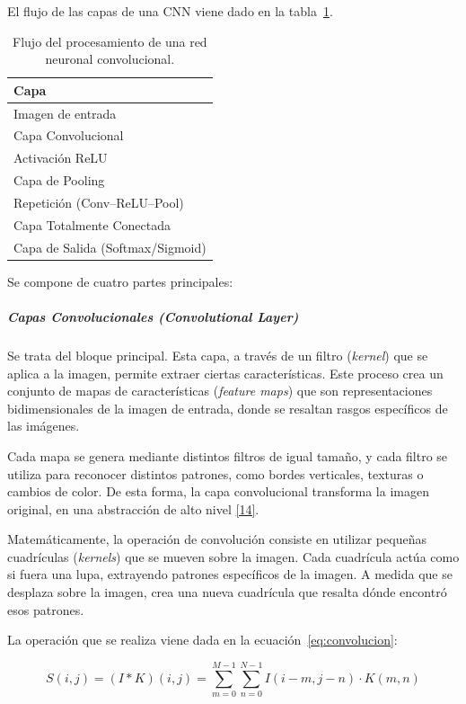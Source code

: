\documentclass[11pt, a4paper]{article}
\numberwithin{equation}{section}
\begin{document}
El flujo de las capas de una CNN viene dado en la tabla~\ref{tab:flujo_cnn}.

\begin{table}[H]
\centering
\caption{Flujo del procesamiento de una red neuronal convolucional.}
\label{tab:flujo_cnn}
\begin{tabular}{l}
\toprule
\textbf{Capa} \\
\midrule
Imagen de entrada \\
Capa Convolucional \\
Activación ReLU \\
Capa de Pooling \\
Repetición (Conv--ReLU--Pool) \\
Capa Totalmente Conectada \\
Capa de Salida (Softmax/Sigmoid) \\
\bottomrule
\end{tabular}
\end{table}

Se compone de cuatro partes principales:

\subparagraph{Capas Convolucionales (Convolutional Layer)}

Se trata del bloque principal. Esta capa, a través de un filtro (\textit{kernel}) que se aplica a la imagen, permite extraer ciertas características. Este proceso crea un conjunto de mapas de características (\textit{feature maps}) que son representaciones bidimensionales de la imagen de entrada, donde se resaltan rasgos específicos de las imágenes.

Cada mapa se genera mediante distintos filtros de igual tamaño, y cada filtro se utiliza para reconocer distintos patrones, como bordes verticales, texturas o cambios de color. De esta forma, la capa convolucional transforma la imagen original, en una abstracción de alto nivel \hyperlink{ref:14}{[14]}.

Matemáticamente, la operación de convolución consiste en utilizar pequeñas cuadrículas (\textit{kernels}) que se mueven sobre la imagen. Cada cuadrícula actúa como si fuera una lupa, extrayendo patrones específicos de la imagen. A medida que se desplaza sobre la imagen, crea una nueva cuadrícula que resalta dónde encontró esos patrones.

La operación que se realiza viene dada en la ecuación~\eqref{eq:convolucion}:

\begin{equation}
\label{eq:convolucion}
S(i, j) = (I * K)(i, j) = \sum_{m=0}^{M-1} \sum_{n=0}^{N-1} I(i-m, j-n) \cdot K(m, n)
\end{equation}
\end{document}
